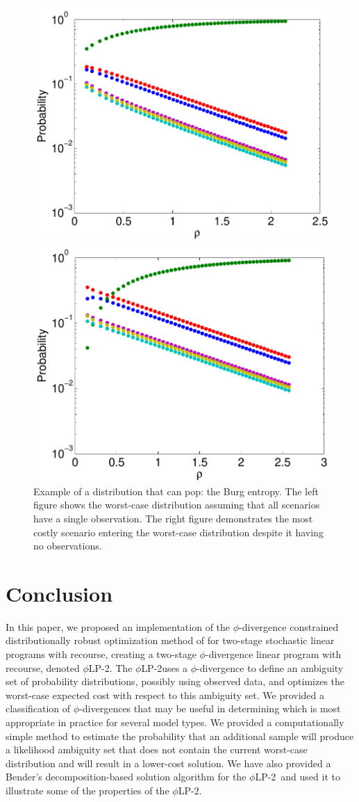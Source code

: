 \documentclass[ijoc,letterpaper]{informs3} %
\newcommand{\plp}{$\phi$LP-2}
\begin{document}
\begin{figure}
	\FIGURE
	{%
		\includegraphics*[width=.5\textwidth]{images/burg}%
		\includegraphics*[width=.5\textwidth]{images/burg_zero}%
	}
	{
		Example of a distribution that can pop: the Burg entropy.
		The left figure shows the worst-case distribution assuming that all scenarios have a single observation.
		The right figure demonstrates the most costly scenario entering the worst-case distribution despite it having no observations.
		\label{fig:pop}
	}
	{}
\end{figure}

\section{Conclusion}
\label{sec:concl}

In this paper, we proposed an implementation of the $\phi$-divergence constrained distributionally robust optimization method of \cite{bental2011robust} for two-stage stochastic linear programs with recourse, creating a two-stage $\phi$-divergence linear program with recourse, denoted \plp.
The \plp uses a $\phi$-divergence to define an ambiguity set of probability distributions, possibly using observed data, and optimizes the worst-case expected cost with respect to this ambiguity set.
We provided a classification of $\phi$-divergences that may be useful in determining which is most appropriate in practice for several model types.
We provided a computationally simple method to estimate the probability that an additional sample will produce a likelihood ambiguity set that does not contain the current worst-case distribution and will result in a lower-cost solution. 
We have also provided a Bender's decomposition-based solution algorithm for the \plp\ and used it to illustrate some of the properties of the \plp.
\end{document}
